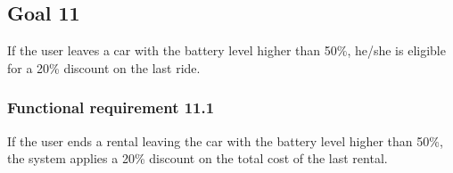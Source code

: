 \subsection{Goal 11}
If the user leaves a car with the battery level higher than 50\%, he/she is eligible for a 20\% discount on the last ride.

\setcounter{secnumdepth}{3}
\subsubsection{Functional requirement 11.1}
If the user ends a rental leaving the car with the battery level higher than 50\%, the system applies a 20\% discount on the total cost of the last rental.

